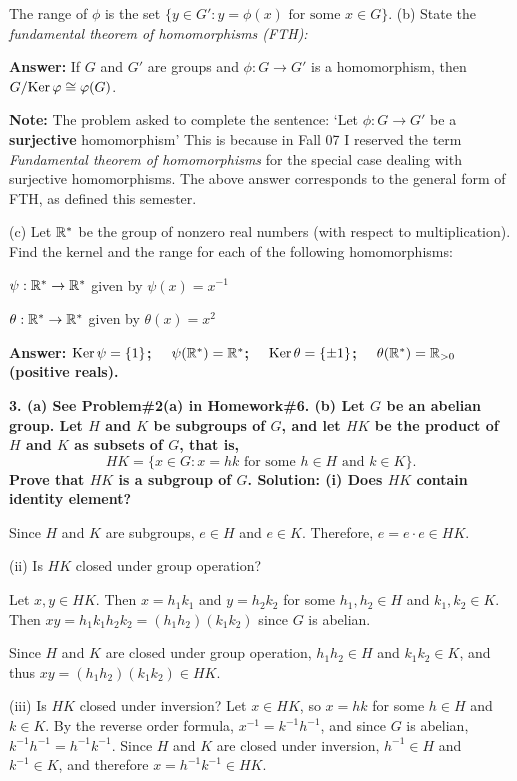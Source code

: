 \documentclass[12pt]{article}
\begin{document}
The range of $\phi$ is the set $\{y\in G' : y=\phi(x) \mbox{ for some } x\in G\}$.
\skv
(b)  State the \it{fundamental theorem of homomorphisms }\rm (FTH):

{\bf Answer: } If $G$ and $G'$ are groups and $\phi: G\to G'$ is a homomorphism, then
$G/{\rm Ker\,}{\varphi}\cong {\varphi}(G)$.

{\bf Note: } The problem asked to complete the sentence: `Let $\phi: G\to G'$ be a {\bf surjective } homomorphism' 
This is because in Fall 07 I reserved the term 
{\it Fundamental theorem of homomorphisms } for the special case dealing with surjective homomorphisms.
The above answer corresponds to the general form of FTH, as defined this semester.

\skv
(c) Let ${\mathbb R}^*$ be the group of nonzero real numbers (with respect to multiplication).
Find the kernel and the range for each of the following homomorphisms:

\sk $\psi: {\mathbb R}^*\to{\mathbb R}^*$ given by $\psi(x)=x^{-1}$

\sk $\theta: {\mathbb R}^*\to{\mathbb R}^*$ given by $\theta(x)=x^{2}$

\bf{Answer: }\rm ${\rm Ker\,}\psi=\{1\}$; $\quad\psi({\mathbb R}^*)={\mathbb R}^*$;
$\quad{\rm Ker\,}\theta=\{\pm 1\}$;  $\quad\theta({\mathbb R}^*)={\mathbb R}_{>0}$ (positive reals).
\skv

\bf{3. }\rm (a) See Problem\#2(a) in Homework\#6.
\skv
(b) Let $G$ be an \bf{abelian }\rm group. Let $H$ and $K$ be subgroups
of $G$, and let $HK$ be the product of $H$ and $K$ as subsets of $G$, that is,
$$HK=\{x\in G: x=hk \mbox{ for some }h\in H\mbox{ and }k\in K\}.$$
Prove that $HK$ is a subgroup of $G$.
\skv
{\bf Solution: } (i) Does $HK$ contain identity element?

Since $H$ and $K$ are subgroups, $e\in H$ and $e\in K$.
Therefore, $e=e\cdot e\in HK$.
\skv

(ii) Is $HK$ closed under group operation?

Let $x,y\in HK$. Then $x=h_1k_1$ and $y=h_2 k_2$ for some $h_1,h_2\in H$ and $k_1,k_2\in K$.
Then $xy=h_1 k_1 h_2 k_2=(h_1 h_2) (k_1 k_2)$ since $G$ is abelian.

Since $H$ and $K$ are closed under group operation, $h_1 h_2\in H$ and $k_1 k_2\in K$, and thus
$xy=(h_1 h_2) (k_1 k_2)\in HK$.
\skv

(iii) Is $HK$ closed under inversion?
\skv 
Let $x\in HK$, so $x=hk$ for some $h\in H$ and $k\in K$. By the reverse order formula,
$x^{-1}=k^{-1}h^{-1}$, and since $G$ is abelian, $k^{-1}h^{-1}=h^{-1}k^{-1}$.
Since $H$ and $K$ are closed under inversion, $h^{-1}\in H$ and $k^{-1}\in K$,
and therefore $x=h^{-1}k^{-1}\in HK$.
\skv
\end{document}
